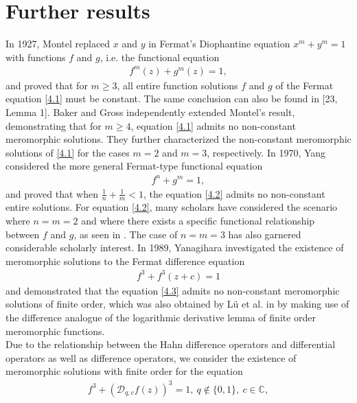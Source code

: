 \documentclass[sn-mathphys-num]{sn-jnl}%
\theoremstyle{thmstyleone}%
\theoremstyle{thmstyletwo}%
\theoremstyle{thmstylethree}%
\begin{document}
\section{Further results}
In 1927, Montel \cite{Montel} replaced \(x\) and \(y\) in Fermat's Diophantine equation \(x^{m}+y^{m}=1\) with functions \(f\) and \(g\), i.e. the functional equation
\begin{align}\label{4.1}
	f^{m}(z)+g^{m}(z)=1,
\end{align}
and proved that for \(m \geq 3\), all entire function solutions \(f\) and \(g\) of the Fermat equation \eqref{4.1} must be constant. The same conclusion can also be found in [23, Lemma 1]. Baker \cite{Baker} and Gross \cite{Gross} independently extended Montel's result, demonstrating that for \(m \geq 4\), equation \eqref{4.1} admits no non-constant meromorphic solutions. They further characterized the non-constant meromorphic solutions of \eqref{4.1} for the cases \(m = 2\) and \(m = 3\), respectively. In 1970, Yang \cite{Yang} considered the more general Fermat-type functional equation
\begin{align}\label{4.2}
	f^{n} + g^{m} = 1,
\end{align}
and proved that when \(\frac{1}{n} + \frac{1}{m} < 1\), the equation \eqref{4.2} admits no non-constant entire solutions. For equation \eqref{4.2}, many scholars have considered the scenario where \(n = m = 2\) and where there exists a specific functional relationship between \(f\) and \(g\), as seen in \cite{Li, LC, LQ, LY, TL, YL, YS}. The case of \(n = m = 3\) has also garnered considerable scholarly interest. In 1989, Yanagihara \cite{Yana} investigated the existence of meromorphic solutions to the Fermat difference equation
\begin{align}\label{4.3}
	f^{3}+f^{3}(z+c)=1
\end{align}
and demonstrated that the equation \eqref{4.3} admits no non-constant meromorphic solutions of finite order, which was also obtained by L\"{u} et al. in \cite{LV} by making use of the difference analogue of the logarithmic derivative lemma of finite order meromorphic functions.\\
\indent Due to the relationship between the Hahn difference operators and differential operators as well as difference operators, we consider the existence of meromorphic solutions with finite order for the equation
\begin{align}\label{4.4}
	f^{3}+(\mathcal{D}_{q,c}f(z))^{3}=1,~q\not\in\{0,1\},~c\in\mathbb{C},
\end{align}
\end{document}
